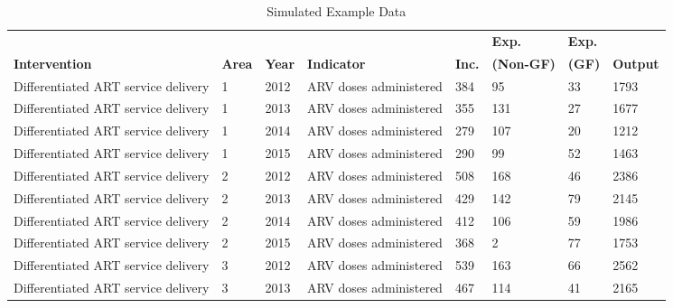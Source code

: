 \documentclass{article}
\begin{document}
\begin{table}[]
\centering
\caption{Simulated Example Data}
\label{example_table}
\begin{tabular}{llllllll}
                                                       &      &      &                                 &           & \textbf{Exp.} & \textbf{Exp.} &        \\
\textbf{Intervention}                                  & \textbf{Area} & \textbf{Year} & \textbf{Indicator} & \textbf{Inc.} & \textbf{(Non-GF)}           & \textbf{(GF)}   & \textbf{Output} \\
\hline
Differentiated ART service delivery & 1    & 2012 & ARV doses administered     & 384       & 95                 & 33              & 1793   \\
Differentiated ART service delivery & 1    & 2013 & ARV doses administered     & 355       & 131                & 27              & 1677   \\
Differentiated ART service delivery & 1    & 2014 & ARV doses administered     & 279       & 107                & 20              & 1212   \\
Differentiated ART service delivery & 1    & 2015 & ARV doses administered     & 290       & 99                 & 52              & 1463   \\
Differentiated ART service delivery & 2    & 2012 & ARV doses administered     & 508       & 168                & 46              & 2386   \\
Differentiated ART service delivery & 2    & 2013 & ARV doses administered     & 429       & 142                & 79              & 2145   \\
Differentiated ART service delivery & 2    & 2014 & ARV doses administered     & 412       & 106                & 59              & 1986   \\
Differentiated ART service delivery & 2    & 2015 & ARV doses administered     & 368       & 2                  & 77              & 1753   \\
Differentiated ART service delivery & 3    & 2012 & ARV doses administered     & 539       & 163                & 66              & 2562   \\
Differentiated ART service delivery & 3    & 2013 & ARV doses administered     & 467       & 114                & 41              & 2165   \\

\end{tabular}
\end{table}
\end{document}

